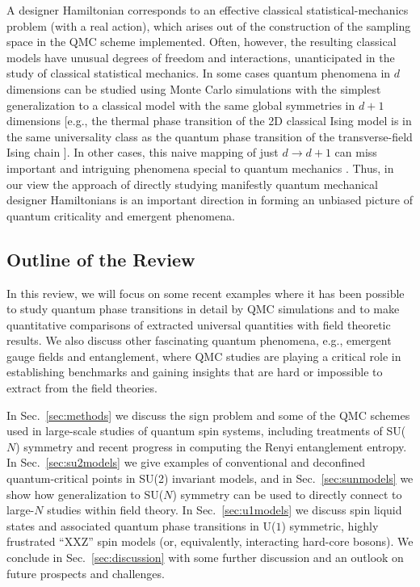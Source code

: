 \documentclass[range]{ar2e}
\begin{document}
A designer Hamiltonian corresponds to an effective classical statistical-mechanics problem (with a real action), which arises out of the construction 
of the sampling space in the QMC scheme implemented. Often, however, the resulting classical models have unusual degrees of freedom and interactions, 
unanticipated in the study of classical statistical mechanics. In some cases quantum phenomena in $d$ dimensions can be studied using Monte Carlo 
simulations with the simplest generalization to a classical model with the same global symmetries in $d+1$ dimensions \cite{Rieger94,Sorensen92,Nahum11} 
[e.g., the thermal phase transition of the 2D classical Ising model is in the same universality class as the quantum phase transition of the transverse-field 
Ising chain \cite{Suzuki76,Sachdev11}]. In other cases, this naive mapping of just $d \to d+1$ can miss important and intriguing phenomena special to quantum 
mechanics \cite{Senthil04a,Fradkin04,Sachdev08}. Thus, in our view the approach of directly studying manifestly quantum mechanical designer Hamiltonians 
is an important direction in forming an unbiased picture of quantum criticality and emergent phenomena.

\subsection{Outline of the Review}

In this review, we will focus on some recent examples where it has been possible to study quantum phase transitions in detail 
by QMC simulations and to make quantitative comparisons of extracted universal quantities with field theoretic results. We also discuss other fascinating quantum phenomena, e.g., emergent gauge fields and entanglement, where QMC studies are
playing a critical role in establishing benchmarks and gaining insights that are hard or impossible to extract from the field theories.

In Sec.~\ref{sec:methods} we discuss the sign problem and some of the QMC schemes used in large-scale studies of quantum spin systems, 
including treatments of SU($N$) symmetry and recent progress in computing the Renyi entanglement entropy. In Sec.~\ref{sec:su2models} 
we give examples of conventional and deconfined quantum-critical points in SU(2) invariant models, and in Sec.~\ref{sec:sunmodels} 
we show how generalization to SU($N$) symmetry can be used to directly connect to large-$N$ studies within field theory. In Sec.~\ref{sec:u1models} 
we discuss spin liquid states and associated quantum phase transitions in U($1$) symmetric, highly frustrated ``XXZ'' spin models (or, equivalently, 
interacting hard-core bosons). We conclude in Sec.~\ref{sec:discussion} with some further discussion and an outlook on future prospects and challenges.
\end{document}
